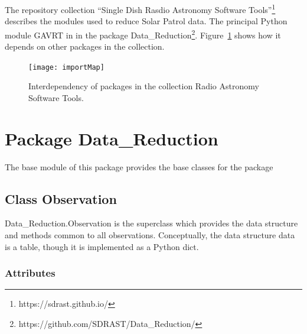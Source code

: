 \documentclass[letterpaper,11pt]{report}
\begin{document}
The repository collection ``Single Dish Rasdio Astronomy Software Tools''\footnote{\ttfamily https://sdrast.github.io/} describes the modules used to reduce Solar Patrol data. The principal Python module {\ttfamily GAVRT} in in the package {\ttfamily Data\_Reduction}\footnote{\ttfamily https://github.com/SDRAST/Data\_Reduction/}.  Figure~\ref{fig:import-map} shows how it depends on other packages in the collection.
\begin{figure}[h!tb]
	\begin{center}
		\texttt{[image: importMap]}
		\caption{\label{fig:import-map}Interdependency of packages in the collection Radio Astronomy Software Tools.}
	\end{center}
\end{figure}

\section{Package {\ttfamily Data\_Reduction}}

The base module of this package provides the base classes for the package

\subsection{Class {\ttfamily Observation}}

{\ttfamily Data\_Reduction.Observation} is the superclass which provides the data structure and methods common to all observations. Conceptually, the data structure {\ttfamily data} is a table, though it is implemented as a Python {\ttfamily dict}.  

\subsubsection{Attributes}
\end{document}
